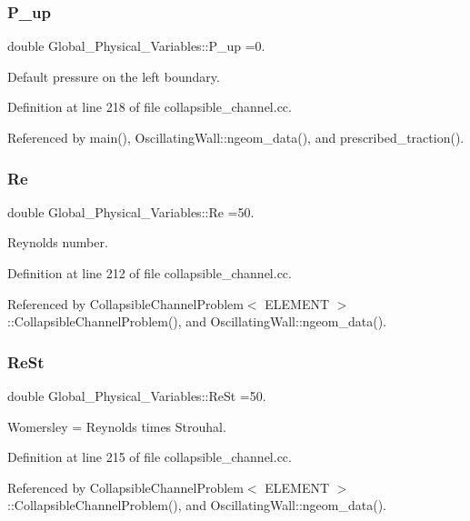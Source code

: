 \subsubsection{\texorpdfstring{P\+\_\+up}{P\_up}}
{\footnotesize\ttfamily double Global\+\_\+\+Physical\+\_\+\+Variables\+::\+P\+\_\+up =0.}



Default pressure on the left boundary. 



Definition at line 218 of file collapsible\+\_\+channel.\+cc.



Referenced by main(), Oscillating\+Wall\+::ngeom\+\_\+data(), and prescribed\+\_\+traction().

\mbox{\label{namespaceGlobal__Physical__Variables_ab814e627d2eb5bc50318879d19ab16b9}} 
\subsubsection{\texorpdfstring{Re}{Re}}
{\footnotesize\ttfamily double Global\+\_\+\+Physical\+\_\+\+Variables\+::\+Re =50.}



Reynolds number. 



Definition at line 212 of file collapsible\+\_\+channel.\+cc.



Referenced by Collapsible\+Channel\+Problem$<$ E\+L\+E\+M\+E\+N\+T $>$\+::\+Collapsible\+Channel\+Problem(), and Oscillating\+Wall\+::ngeom\+\_\+data().

\mbox{\label{namespaceGlobal__Physical__Variables_a085ee4bf968ffdd01a41b8c41864f907}} 
\subsubsection{\texorpdfstring{Re\+St}{ReSt}}
{\footnotesize\ttfamily double Global\+\_\+\+Physical\+\_\+\+Variables\+::\+Re\+St =50.}



Womersley = Reynolds times Strouhal. 



Definition at line 215 of file collapsible\+\_\+channel.\+cc.



Referenced by Collapsible\+Channel\+Problem$<$ E\+L\+E\+M\+E\+N\+T $>$\+::\+Collapsible\+Channel\+Problem(), and Oscillating\+Wall\+::ngeom\+\_\+data().

